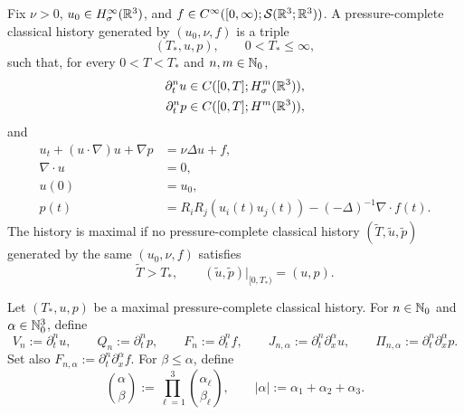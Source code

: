 \begin{samepage}
\begin{definition}
\label{def:formal-maximal-history}
Fix \(\nu>0\), \(u_0\in H^\infty_\sigma(\mathbb R^3)\), and
\(f\in C^\infty([0,\infty);\mathcal S(\mathbb R^3;\mathbb R^3))\).  A
pressure-complete classical history generated by \((u_0,\nu,f)\) is a triple
\[
 (T_*,u,p),
 \qquad
 0<T_*\le\infty,
\]
such that, for every \(0<T<T_*\) and \(n,m\in\mathbb N_0\),
\begin{align*}
 \partial_t^nu&\in C([0,T];H^m_\sigma(\mathbb R^3)),\\
 \partial_t^np&\in C([0,T];H^m(\mathbb R^3)),
\end{align*}
and
\begin{align}
 u_t+(u\cdot\nabla)u+\nabla p&=\nu\Delta u+f,
 \label{eq:formal-history-momentum}\\
 \nabla\cdot u&=0,
 \label{eq:formal-history-divergence}\\
 u(0)&=u_0,
 \label{eq:formal-history-datum}\\
 p(t)&=R_iR_j(u_i(t)u_j(t))
 -(-\Delta)^{-1}\nabla\cdot f(t).
 \label{eq:formal-history-pressure}
\end{align}
The history is maximal if no pressure-complete classical history
\((\widetilde T,\widetilde u,\widetilde p)\) generated by the same
\((u_0,\nu,f)\)
satisfies
\[
 \widetilde T>T_*,
 \qquad
 (\widetilde u,\widetilde p)|_{[0,T_*)}=(u,p).
\]
\end{definition}
\end{samepage}

\begin{definition}
\label{def:formal-mixed-jet}
Let \((T_*,u,p)\) be a maximal pressure-complete classical history.  For
\(n\in\mathbb N_0\) and \(\alpha\in\mathbb N_0^3\), define
\[
 V_n:=\partial_t^nu,
 \qquad
 Q_n:=\partial_t^np,
 \qquad
 F_n:=\partial_t^nf,
 \qquad
 J_{n,\alpha}:=\partial_t^n\partial_x^\alpha u,
 \qquad
 \Pi_{n,\alpha}:=\partial_t^n\partial_x^\alpha p.
\]
Set also \(F_{n,\alpha}:=\partial_t^n\partial_x^\alpha f\).
For \(\beta\le\alpha\), define
\[
 \binom{\alpha}{\beta}
 :=\prod_{\ell=1}^3\binom{\alpha_\ell}{\beta_\ell},
 \qquad
 |\alpha|:=\alpha_1+\alpha_2+\alpha_3.
\]
\end{definition}

